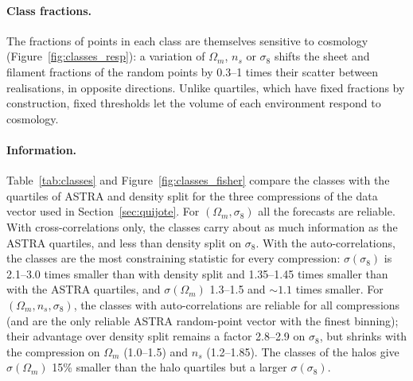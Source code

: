 \documentclass[11pt,twocolumn]{article}
\begin{document}
\paragraph{Class fractions.} The fractions of points in each class are themselves sensitive to cosmology (Figure~\ref{fig:classes_resp}): a variation of $\Omega_m$, $n_s$ or $\sigma_8$ shifts the sheet and filament fractions of the random points by 0.3--1 times their scatter between realisations, in opposite directions. Unlike quartiles, which have fixed fractions by construction, fixed thresholds let the volume of each environment respond to cosmology.

\paragraph{Information.} Table~\ref{tab:classes} and Figure~\ref{fig:classes_fisher} compare the classes with the quartiles of ASTRA and density split for the three compressions of the data vector used in Section~\ref{sec:quijote}. For $(\Omega_m,\sigma_8)$ all the forecasts are reliable. With cross-correlations only, the classes carry about as much information as the ASTRA quartiles, and less than density split on $\sigma_8$. With the auto-correlations, the classes are the most constraining statistic for every compression: $\sigma(\sigma_8)$ is 2.1--3.0 times smaller than with density split and 1.35--1.45 times smaller than with the ASTRA quartiles, and $\sigma(\Omega_m)$ 1.3--1.5 and $\sim1.1$ times smaller. For $(\Omega_m,n_s,\sigma_8)$, the classes with auto-correlations are reliable for all compressions (and are the only reliable ASTRA random-point vector with the finest binning); their advantage over density split remains a factor 2.8--2.9 on $\sigma_8$, but shrinks with the compression on $\Omega_m$ (1.0--1.5) and $n_s$ (1.2--1.85). The classes of the halos give $\sigma(\Omega_m)$ 15\% smaller than the halo quartiles but a larger $\sigma(\sigma_8)$.
\end{document}
